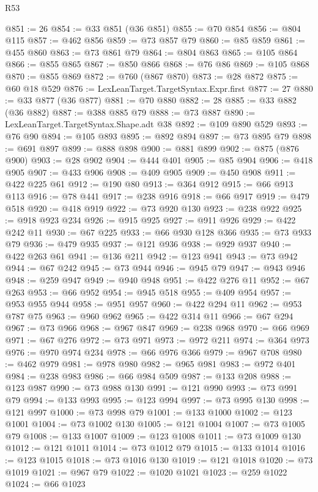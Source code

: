 \begin{lexlean}{R53}
\begin{coremodule}
@851 := 26
@854 := @33 @851 (@36 @851)
@855 := @70 @854
@856 := @804 @115
@857 := @462 @856
@859 := @73 @857 @79
@860 := @85 @859
@861 := @455 @860
@863 := @73 @861 @79
@864 := @804 @863
@865 := @105 @864
@866 := @855 @865
@867 := @850 @866
@868 := @76 @86
@869 := @105 @868
@870 := @855 @869
@872 := @760 (@867 @870)
@873 := @28 @872
@875 := @60 @18 @529
@876 := LexLeanTarget.TargetSyntax.Expr.first
@877 := 27
@880 := @33 @877 (@36 @877)
@881 := @70 @880
@882 := 28
@885 := @33 @882 (@36 @882)
@887 := @388 @885 @79
@888 := @73 @887
@890 := LexLeanTarget.TargetSyntax.Shape.adt @38
@892 := @109 @890 @529
@893 := @76 @90
@894 := @105 @893
@895 := @892 @894
@897 := @73 @895 @79
@898 := @691 @897
@899 := @888 @898
@900 := @881 @899
@902 := @875 (@876 @900)
@903 := @28 @902
@904 := @444 @401
@905 := @85 @904
@906 := @418 @905
@907 := @433 @906
@908 := @409 @905
@909 := @450 @908
@911 := @422 @225 @61
@912 := @190 @80
@913 := @364 @912
@915 := @66 @913 @113
@916 := @78 @441
@917 := @238 @916
@918 := @66 @917
@919 := @479 @518
@920 := @418 @919
@922 := @73 @920 @130
@923 := @238 @922
@925 := @918 @923 @234
@926 := @915 @925
@927 := @911 @926
@929 := @422 @242 @11
@930 := @67 @225
@933 := @66 @930 @128 @366
@935 := @73 @933 @79
@936 := @479 @935
@937 := @121 @936
@938 := @929 @937
@940 := @422 @263 @61
@941 := @136 @211
@942 := @123 @941
@943 := @73 @942
@944 := @67 @242
@945 := @73 @944
@946 := @945 @79
@947 := @943 @946
@948 := @259 @947
@949 := @940 @948
@951 := @422 @276 @11
@952 := @67 @263
@953 := @66 @952
@954 := @945 @518
@955 := @409 @954
@957 := @953 @955 @944
@958 := @951 @957
@960 := @422 @294 @11
@962 := @953 @787 @75
@963 := @960 @962
@965 := @422 @314 @11
@966 := @67 @294
@967 := @73 @966
@968 := @967 @847
@969 := @238 @968
@970 := @66 @969
@971 := @67 @276
@972 := @73 @971
@973 := @972 @211
@974 := @364 @973
@976 := @970 @974 @234
@978 := @66 @976 @366
@979 := @967 @708
@980 := @462 @979
@981 := @978 @980
@982 := @965 @981
@983 := @972 @401
@984 := @238 @983
@986 := @66 @984 @509
@987 := @133 @208
@988 := @123 @987
@990 := @73 @988 @130
@991 := @121 @990
@993 := @73 @991 @79
@994 := @133 @993
@995 := @123 @994
@997 := @73 @995 @130
@998 := @121 @997
@1000 := @73 @998 @79
@1001 := @133 @1000
@1002 := @123 @1001
@1004 := @73 @1002 @130
@1005 := @121 @1004
@1007 := @73 @1005 @79
@1008 := @133 @1007
@1009 := @123 @1008
@1011 := @73 @1009 @130
@1012 := @121 @1011
@1014 := @73 @1012 @79
@1015 := @133 @1014
@1016 := @123 @1015
@1018 := @73 @1016 @130
@1019 := @121 @1018
@1020 := @73 @1019
@1021 := @967 @79
@1022 := @1020 @1021
@1023 := @259 @1022
@1024 := @66 @1023

\end{coremodule}
\end{lexlean}
